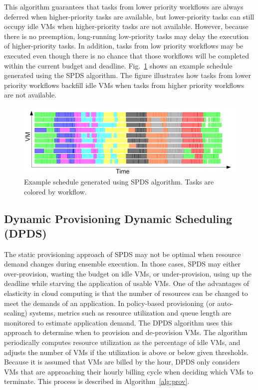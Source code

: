 \documentclass{sig-alternate}
\begin{document}
This algorithm guarantees that tasks from lower priority workflows are
always deferred when higher-priority tasks are available, but lower-priority
tasks can still occupy idle VMs when higher-priority tasks are not available. 
However, because there is no preemption, long-running low-priority tasks may delay 
the execution of higher-priority tasks. In addition, tasks from low priority 
workflows may be executed even though there is no chance that those workflows 
will be completed within the current budget and deadline. Fig.~\ref{fig:spds-example} 
shows an example schedule generated using the SPDS algorithm. The figure illustrates 
how tasks from lower priority workflows backfill idle VMs when tasks from higher 
priority workflows are not available.

\begin{figure}[htb] 
\centering
\includegraphics[width=1.0\columnwidth]{figures/spds-gantt}
 \caption{Example schedule generated using SPDS algorithm. Tasks are colored by workflow. }
\label{fig:spds-example}
\end{figure}

\subsection{Dynamic Provisioning Dynamic Scheduling (DPDS)}
 
The static provisioning approach of SPDS may not be optimal when resource demand
changes during ensemble execution. In those cases, SPDS may either over-provision, 
wasting the budget on idle VMs, or under-provision, using up the deadline while starving 
the application of usable VMs. One of the advantages of elasticity in cloud computing 
is that the number of resources can be changed to meet the demands of an application.
In policy-based provisioning (or auto-scaling) systems, metrics such as resource 
utilization and queue length are monitored to estimate application demand. The DPDS 
algorithm uses this approach to determine when to provision and de-provision VMs. The 
algorithm periodically computes resource utilization as the percentage of idle VMs, and
adjusts the number of VMs if the utilization is above or below given thresholds.
Because it is assumed that VMs are billed by the hour, DPDS only considers VMs that are
approaching their hourly billing cycle when deciding which VMs to terminate. This process
is described in Algorithm~\ref{alg:prov}.
\end{document}
